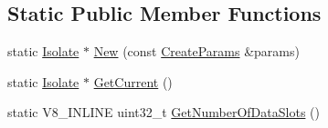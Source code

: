\subsection*{Static Public Member Functions}
\begin{DoxyCompactItemize}
\item 
static \hyperlink{classv8_1_1_isolate}{Isolate} $\ast$ \hyperlink{classv8_1_1_isolate_abab88b427984481cb58c371f6cb30005}{New} (const \hyperlink{structv8_1_1_isolate_1_1_create_params}{Create\+Params} \&params)
\item 
static \hyperlink{classv8_1_1_isolate}{Isolate} $\ast$ \hyperlink{classv8_1_1_isolate_afd8c10d0f01e2ae43522c3ddf0bb053d}{Get\+Current} ()
\item 
static V8\+\_\+\+I\+N\+L\+I\+NE uint32\+\_\+t \hyperlink{classv8_1_1_isolate_a7060092fd45588f4085753b3da1b2c82}{Get\+Number\+Of\+Data\+Slots} ()
\end{DoxyCompactItemize}
